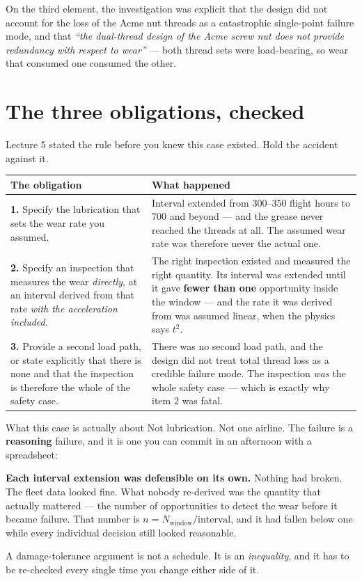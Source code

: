 \documentclass[11pt,a4paper]{article}
\begin{document}
\medskip
On the third element, the investigation was explicit that the design did not account for the loss of
the Acme nut threads as a catastrophic single-point failure mode, and that \emph{``the dual-thread
design of the Acme screw nut does not provide redundancy with respect to wear''} --- both thread
sets were load-bearing, so wear that consumed one consumed the other.

\section{The three obligations, checked}

Lecture 5 stated the rule before you knew this case existed. Hold the accident against it.

\begin{center}\small
\begin{tabular}{@{}p{6.1cm}p{10.0cm}@{}}
\toprule
The obligation & What happened\\
\midrule
\textbf{1.} Specify the lubrication that sets the wear rate you assumed. &
  Interval extended from \numrange{300}{350} flight hours to \num{700} and beyond --- and the
  grease never reached the threads at all. The assumed wear rate was therefore never the actual
  one.\\[3pt]
\textbf{2.} Specify an inspection that measures the wear \emph{directly}, at an interval derived
  from that rate \emph{with the acceleration included}. &
  The right inspection existed and measured the right quantity. Its interval was extended until it
  gave \textbf{fewer than one} opportunity inside the window --- and the rate it was derived from
  was assumed linear, when the physics says $t^2$.\\[3pt]
\textbf{3.} Provide a second load path, or state explicitly that there is none and that the
  inspection is therefore the whole of the safety case. &
  There was no second load path, and the design did not treat total thread loss as a credible
  failure mode. The inspection \emph{was} the whole safety case --- which is exactly why item 2
  was fatal.\\
\bottomrule
\end{tabular}
\end{center}

\begin{sumbox}{What this case is actually about}
Not lubrication. Not one airline. The failure is a \textbf{reasoning} failure, and it is one you
can commit in an afternoon with a spreadsheet:

\medskip
\textbf{Each interval extension was defensible on its own.} Nothing had broken. The fleet data
looked fine. What nobody re-derived was the quantity that actually mattered --- the number of
opportunities to detect the wear before it became failure. That number is
$n = N_{\text{window}}/\text{interval}$, and it had fallen below one while every individual decision
still looked reasonable.

\medskip
A damage-tolerance argument is not a schedule. It is an \emph{inequality}, and it has to be
re-checked every single time you change either side of it.
\end{sumbox}
\end{document}
